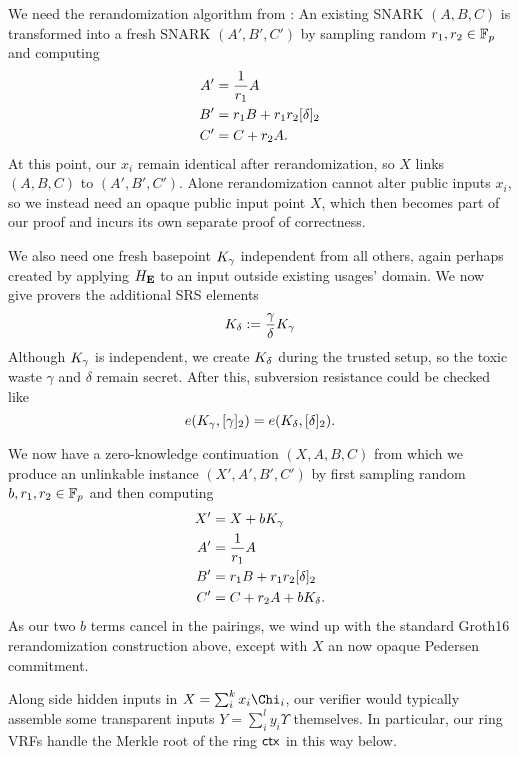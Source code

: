 We need the rerandomization algorithm from \cite[Fig.~1]{RandomizationGroth16}:
An existing SNARK $(A,B,C)$ is transformed into a fresh
SNARK $(A',B',C')$ by sampling random $r_1,r_2 \in \mathbb{F}_p$ and computing
$$ \begin{aligned}
A' &= {1 \over r_1} A \\
B' &= r_1 B + r_1 r_2 [\delta]_2 \\
C' &= C + r_2 A . \\
\end{aligned} $$
At this point, our $x_i$ remain identical after rerandomization,
so $X$ links $(A,B,C)$ to $(A',B',C')$.
Alone rerandomization cannot alter public inputs $x_i$, so
we instead need an opaque public input point $X$, which then becomes
part of our proof and incurs its own separate proof of correctness.

We also need one fresh basepoint $K_\gamma$ independent from all others,
again perhaps created by applying $H_{\mathbf{E}}$ to an input outside existing usages' domain.
We now give provers the additional SRS elements
$$ K_\delta := {\gamma\over\delta} K_\gamma $$
Although $K_\gamma$ is independent, 
we create $K_\delta$ during the trusted setup,
 so the toxic waste $\gamma$ and $\delta$ remain secret.
After this, subversion resistance could be checked like 
$$ e(K_\gamma, [\gamma]_2) = e(K_\delta, [\delta]_2) . $$

We now have a zero-knowledge continuation $(X,A,B,C)$ from which
we produce an unlinkable instance $(X',A',B',C')$ by
 first sampling random $b,r_1,r_2 \in \mathbb{F}_p$ and then computing
$$ \begin{aligned}
X' &= X + b K_\gamma \\
A' &= {1 \over r_1} A \\
B' &= r_1 B + r_1 r_2 [\delta]_2 \\
C' &= C + r_2 A + b K_\delta . \\
\end{aligned} $$
As our two $b$ terms cancel in the pairings, we wind up with the
standard Groth16 rerandomization construction above,
 except with $X$ an now opaque Pedersen commitment.


Along side hidden inputs in $X = \sum_i^k x_i \Chi_i$,
our verifier would typically assemble some transparent inputs
$Y = \sum_i^l y_i \Upsilon$ themselves.  In particular, our ring VRFs
handle the Merkle root \comring of the ring $\mathsf{ctx}$ in this way below.

